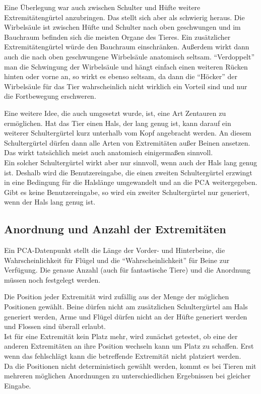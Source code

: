 Eine Überlegung war auch zwischen Schulter und Hüfte weitere Extremitätengürtel anzubringen. Das stellt sich aber als schwierig heraus. Die Wirbelsäule ist zwischen Hüfte und Schulter nach oben geschwungen und im Bauchraum befinden sich die meisten Organe des Tieres. Ein zusätzlicher Extremitätengürtel würde den Bauchraum einschränken. Außerdem wirkt dann auch die nach oben geschwungene Wirbelsäule anatomisch seltsam.
"`Verdoppelt"' man die Schwingung der Wirbelsäule und hängt einfach einen weiteren Rücken hinten oder vorne an, so wirkt es ebenso seltsam, da dann die "`Höcker"' der Wirbelsäule für das Tier wahrscheinlich nicht wirklich ein Vorteil sind und nur die Fortbewegung erschweren.

Eine weitere Idee, die auch umgesetzt wurde, ist, eine Art Zentauren zu ermöglichen. Hat das Tier einen Hals, der lang genug ist, kann darauf ein weiterer Schultergürtel kurz unterhalb vom Kopf angebracht werden. An diesem Schultergürtel dürfen dann alle Arten von Extremitäten außer Beinen ansetzen. Das wirkt tatsächlich meist auch anatomisch einigermaßen sinnvoll.\\
Ein solcher Schultergürtel wirkt aber nur sinnvoll, wenn auch der Hals lang genug ist. Deshalb wird die Benutzereingabe, die einen zweiten Schultergürtel erzwingt in eine Bedingung für die Halslänge umgewandelt und an die PCA weitergegeben. Gibt es keine Benutzereingabe, so wird ein zweiter Schultergürtel nur generiert, wenn der Hals lang genug ist.

\subsection{Anordnung und Anzahl der Extremitäten}

Ein PCA-Datenpunkt stellt die Länge der Vorder- und Hinterbeine, die Wahrscheinlichkeit für Flügel und die "`Wahrscheinlichkeit"' für Beine zur Verfügung.
Die genaue Anzahl (auch für fantastische Tiere) und die Anordnung müssen noch festgelegt werden.

Die Position jeder Extremität wird zufällig aus der Menge der möglichen Positionen gewählt. Beine dürfen nicht am zusätzlichen Schultergürtel am Hals generiert werden, Arme und Flügel dürfen nicht an der Hüfte generiert werden und Flossen sind überall erlaubt.\\
Ist für eine Extremität kein Platz mehr, wird zunächst getestet, ob eine der anderen Extremitäten an ihre Position wechseln kann um Platz zu schaffen. Erst wenn das fehlschlägt kann die betreffende Extremität nicht platziert werden.\\
Da die Positionen nicht deterministisch gewählt werden, kommt es bei Tieren mit mehreren möglichen Anordnungen zu unterschiedlichen Ergebnissen bei gleicher Eingabe.

